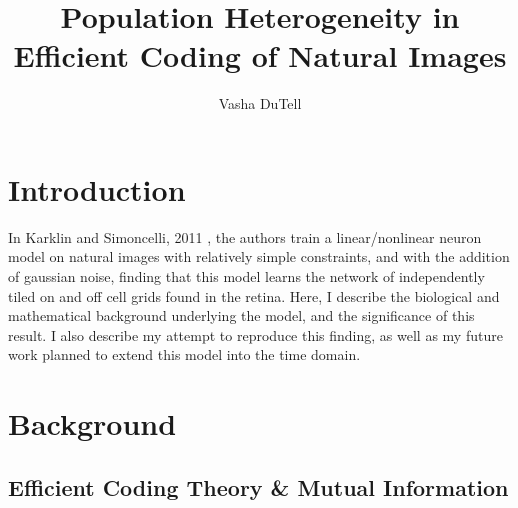 \documentclass{article}
\title{\Large Population Heterogeneity in Efficient Coding of Natural Images}
\author{Vasha DuTell}
\date{}
\begin{document}
\maketitle


\section{Introduction}


	In Karklin and Simoncelli, 2011 \cite{karklin2011}, the authors train a linear/nonlinear neuron model on natural images with relatively simple constraints, and with the addition of gaussian noise, finding that this model learns the network of independently tiled on and off cell grids found in the retina. Here, I describe the biological and mathematical background underlying the model, and the significance of this result. I also describe my attempt to reproduce this finding, as well as my future work planned to extend this model into the time domain. \\


\section{Background}


\subsection{Efficient Coding Theory \& Mutual Information}
\end{document}
